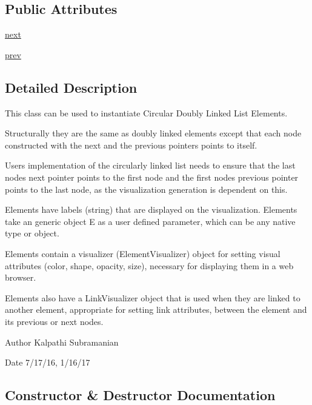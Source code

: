 \subsection*{Public Attributes}
\begin{DoxyCompactItemize}
\item 
\hyperlink{class_bridges_1_1circ__dl__element_1_1_circ_d_lelement_ab22d3f07990637d468acfb7dd47bf905}{next}
\item 
\hyperlink{class_bridges_1_1circ__dl__element_1_1_circ_d_lelement_ac52bcf8fb0ce64dfcda81007643510ab}{prev}
\end{DoxyCompactItemize}


\subsection{Detailed Description}
This class can be used to instantiate Circular Doubly Linked List Elements. 

Structurally they are the same as doubly linked elements except that each node constructed with the next and the previous pointers points to itself.

User\textquotesingle{}s implementation of the circularly linked list needs to ensure that the last node\textquotesingle{}s next pointer points to the first node and the first node\textquotesingle{}s previous pointer points to the last node, as the visualization generation is dependent on this.

Elements have labels (string) that are displayed on the visualization. Elements take an generic object E as a user defined parameter, which can be any native type or object.

Elements contain a visualizer (Element\+Visualizer) object for setting visual attributes (color, shape, opacity, size), necessary for displaying them in a web browser.

Elements also have a Link\+Visualizer object that is used when they are linked to another element, appropriate for setting link attributes, between the element and its previous or next nodes.

\begin{DoxyAuthor}{Author}
Kalpathi Subramanian
\end{DoxyAuthor}
\begin{DoxyDate}{Date}
7/17/16, 1/16/17 
\end{DoxyDate}


\subsection{Constructor \& Destructor Documentation}
\hypertarget{class_bridges_1_1circ__dl__element_1_1_circ_d_lelement_a79664a7230a1c2a55f69ea14f3216512}{}
